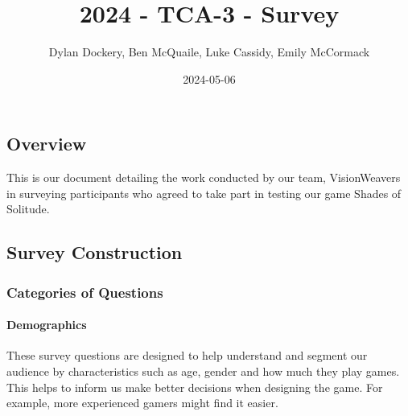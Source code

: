 \documentclass[
  letterpaper,
  DIV=11,
  numbers=noendperiod]{scrartcl}
\title{2024 - TCA-3 - Survey}
\author{Dylan Dockery, Ben McQuaile, Luke Cassidy, Emily McCormack}
\date{2024-05-06}
\let\oldparagraph\paragraph
\renewcommand{\paragraph}[1]{\oldparagraph{#1}\mbox{}}
\renewcommand*\contentsname{Table of contents}
\newcommand\contentsname{Table of contents}
\begin{document}
\maketitle

\renewcommand*\contentsname{Table of contents}
{
\hypersetup{linkcolor=}
\setcounter{tocdepth}{3}
\tableofcontents
}
\subsection{Overview}\label{overview}

This is our document detailing the work conducted by our team,
VisionWeavers in surveying participants who agreed to take part in
testing our game Shades of Solitude.

\subsection{Survey Construction}\label{survey-construction}

\subsubsection{Categories of Questions}\label{categories-of-questions}

\paragraph{Demographics}\label{demographics}

These survey questions are designed to help understand and segment our
audience by characteristics such as age, gender and how much they play
games. This helps to inform us make better decisions when designing the
game. For example, more experienced gamers might find it easier.
\end{document}
